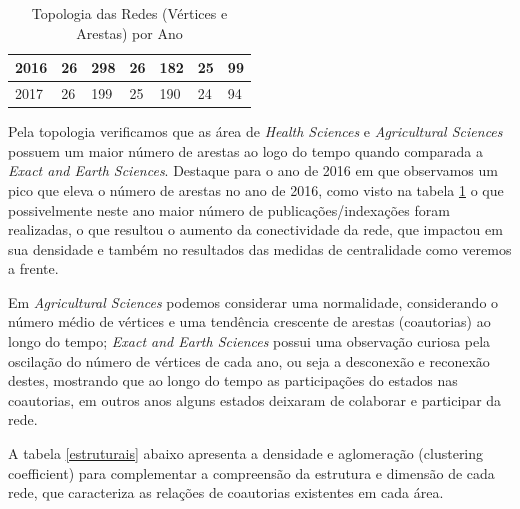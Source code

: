 \begin{table}[H]
\begin{tabular}{lllllll}
		\multicolumn{1}{|l|}{2016}                                  & \multicolumn{1}{l|}{26}                                        & \multicolumn{1}{l|}{298}                                      & \multicolumn{1}{l|}{26}                                        & \multicolumn{1}{l|}{182}                                      & \multicolumn{1}{l|}{25}                                        & \multicolumn{1}{l|}{99}                                       \\ \hline
		\multicolumn{1}{|l|}{2017}                                  & \multicolumn{1}{l|}{26}                                        & \multicolumn{1}{l|}{199}                                      & \multicolumn{1}{l|}{25}                                        & \multicolumn{1}{l|}{190}                                      & \multicolumn{1}{l|}{24}                                        & \multicolumn{1}{l|}{94}                                       \\ \hline
	\end{tabular}
\label{nos-arestas-todos}
\caption{Topologia das Redes (Vértices e Arestas) por Ano}
\end{table}


Pela topologia verificamos que as área de \textit{Health Sciences} e \textit{Agricultural Sciences} possuem um maior número de arestas ao logo do tempo quando comparada a \textit{Exact and Earth Sciences}. Destaque para o ano de 2016 em que observamos um pico que eleva o número de arestas no ano de 2016, como visto na tabela \ref{nos-arestas-todos} o que possivelmente neste ano maior número de publicações/indexações foram realizadas, o que resultou o aumento da conectividade da rede, que impactou em sua densidade e também no resultados das medidas de centralidade como veremos a frente. 

Em \textit{Agricultural Sciences} podemos considerar uma normalidade, considerando o número médio de vértices e uma tendência crescente de arestas (coautorias) ao longo do tempo; \textit{Exact and Earth Sciences} possui uma observação curiosa pela oscilação do número de vértices de cada ano, ou seja a desconexão e reconexão destes, mostrando que ao longo do tempo as participações do estados nas coautorias, em outros anos alguns estados deixaram de colaborar e participar da rede.

A tabela \ref{estruturais} abaixo apresenta a densidade e aglomeração (clustering coefficient) para complementar a compreensão da estrutura e dimensão de cada rede, que caracteriza as relações de coautorias existentes em cada área.

